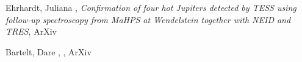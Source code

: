 \item[{\color{numcolor}\scriptsize2}] Ehrhardt, Juliana , \emph{Confirmation of four hot Jupiters detected by TESS using follow-up spectroscopy from MaHPS at Wendelstein together with NEID and TRES}, ArXiv

\item[{\color{numcolor}\scriptsize1}] Bartelt, Dare , , ArXiv